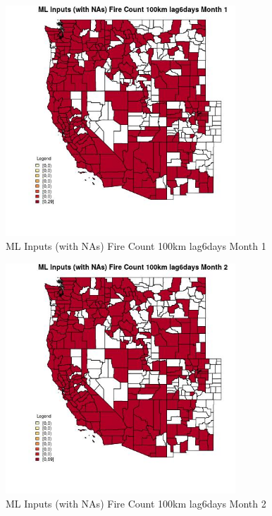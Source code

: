 \begin{figure} 
\centering  
\includegraphics[width=0.77\textwidth]{Code_Outputs/Report_ML_input_PM25_Step4_part_e_de_duplicated_aves_compiled_2019-05-21wNAs_CountyFire_Count_100km_lag6daysmedianMonth1.jpg} 
\caption{\label{fig:Report_ML_input_PM25_Step4_part_e_de_duplicated_aves_compiled_2019-05-21wNAsCountyFire_Count_100km_lag6daysmedianMonth1}ML Inputs (with NAs) Fire Count 100km lag6days Month 1} 
\end{figure} 
 

\begin{figure} 
\centering  
\includegraphics[width=0.77\textwidth]{Code_Outputs/Report_ML_input_PM25_Step4_part_e_de_duplicated_aves_compiled_2019-05-21wNAs_CountyFire_Count_100km_lag6daysmedianMonth2.jpg} 
\caption{\label{fig:Report_ML_input_PM25_Step4_part_e_de_duplicated_aves_compiled_2019-05-21wNAsCountyFire_Count_100km_lag6daysmedianMonth2}ML Inputs (with NAs) Fire Count 100km lag6days Month 2} 
\end{figure} 
 

